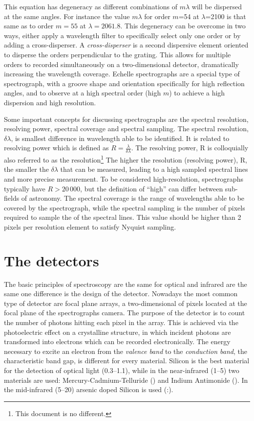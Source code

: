 This equation has degeneracy as different combinations of $m \lambda$ will be dispersed at the same angles.
For instance the value $m \lambda$ for order $m$=54 at $\lambda$=2100\nm{} is that same as to order $m=55$ at $\lambda=2061.8$\nm{}.
This degeneracy can be overcome in two ways, either apply a wavelength filter to specifically select only one order or by adding a cross-disperser.
A \emph{cross-disperser} is a second dispersive element oriented to disperse the orders perpendicular to the grating.
This allows for multiple orders to recorded simultaneously on a two-dimensional detector, dramatically increasing the wavelength coverage.
Echelle spectrographs are a special type of spectrograph, with a groove shape and orientation specifically for high reflection angles, and to observe at a high spectral order (high $m$) to achieve a high dispersion and high resolution.

Some important concepts for discussing spectrographs are the spectral resolution, resolving power, spectral coverage and spectral sampling.
The spectral resolution, \(\delta \lambda\), is smallest difference in wavelength able to be identified.
It is related to resolving power which is defined as \(R=\frac{\lambda}{\delta\lambda}\).
The resolving power, R is colloquially also referred to as the resolution\footnote{This document is no different.} The higher the resolution (resolving power), R, the smaller the \(\delta\lambda\) that can be measured, leading to a high sampled spectral lines and more precise measurement.
To be considered high-resolution, spectrographs typically have \(R>20\,000\), but the definition of ``high'' can differ between sub-fields of astronomy.
The spectral coverage is the range of wavelengths able to be covered by the spectrograph, while the spectral sampling is the number of pixels required to sample the \fwhm{} of the spectral lines.
This value should be higher than 2 pixels per resolution element to satisfy Nyquist sampling.

\section{The detectors}
\label{subsec:nir_detectors}
The basic principles of spectroscopy are the same for optical and infrared are the same one difference is the design of the detector.
Nowadays the most common type of detector are focal plane arrays, a two-dimensional of pixels located at the focal plane of the spectrographs camera.
The purpose of the detector is to count the number of photons hitting each pixel in the array.
This is achieved via the photoelectric effect on a crystalline structure, in which incident photons are transformed into electrons which can be recorded electronically.
The energy necessary to excite an electron from the \emph{valence band} to the \emph{conduction band}, the characteristic band gap, is different for every material.
Silicon is the best material for the detection of optical light (0.3--1.1\um), while in the near-infrared (1--5\um) two materials are used: {Mercury-Cadmium-Telluride} () and {Indium Antimonide} ().
In the mid-infrared (5--20\um) arsenic doped Silicon is used (:).

